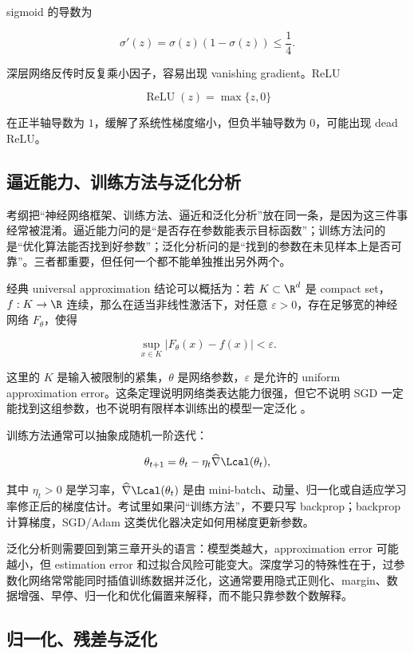 sigmoid 的导数为

\[
  \sigma'(z)=\sigma(z)(1-\sigma(z))\le\frac14.
\]

深层网络反传时反复乘小因子，容易出现 vanishing gradient。ReLU

\[
  \operatorname{ReLU}(z)=\max\{z,0\}
\]

在正半轴导数为 \(1\)，缓解了系统性梯度缩小，但负半轴导数为 \(0\)，可能出现 dead ReLU。

\subsection{逼近能力、训练方法与泛化分析}

考纲把“神经网络框架、训练方法、逼近和泛化分析”放在同一条，是因为这三件事经常被混淆。逼近能力问的是“是否存在参数能表示目标函数”；训练方法问的是“优化算法能否找到好参数”；泛化分析问的是“找到的参数在未见样本上是否可靠”。三者都重要，但任何一个都不能单独推出另外两个。

经典 universal approximation 结论可以概括为：若 \(K\subset\R^d\) 是 compact set，\(f:K\to\R\) 连续，那么在适当非线性激活下，对任意 \(\varepsilon>0\)，存在足够宽的神经网络 \(F_\theta\)，使得

\[
  \sup_{x\in K}|F_\theta(x)-f(x)|<\varepsilon.
\]

这里的 \(K\) 是输入被限制的紧集，\(\theta\) 是网络参数，\(\varepsilon\) 是允许的 uniform approximation error。这条定理说明网络类表达能力很强，但它不说明 SGD 一定能找到这组参数，也不说明有限样本训练出的模型一定泛化 \parencite{goodfellow2016deep,bishop2023deep}。

训练方法通常可以抽象成随机一阶迭代：

\[
  \theta_{t+1}
  =
  \theta_t-\eta_t \widehat{\nabla}\Lcal(\theta_t),
\]

其中 \(\eta_t>0\) 是学习率，\(\widehat{\nabla}\Lcal(\theta_t)\) 是由 mini-batch、动量、归一化或自适应学习率修正后的梯度估计。考试里如果问“训练方法”，不要只写 backprop；backprop 计算梯度，SGD/Adam 这类优化器决定如何用梯度更新参数。

泛化分析则需要回到第三章开头的语言：模型类越大，approximation error 可能越小，但 estimation error 和过拟合风险可能变大。深度学习的特殊性在于，过参数化网络常常能同时插值训练数据并泛化，这通常要用隐式正则化、margin、数据增强、早停、归一化和优化偏置来解释，而不能只靠参数个数解释。

\subsection{归一化、残差与泛化}

